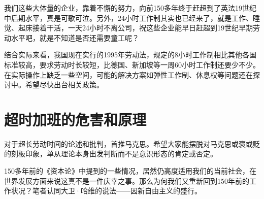 我们这些大体量的企业，靠着不懈的努力，向前150多年终于赶超到了英法19世纪中后期水平，真是可歌可泣。另外，24小时工作制其实也已经来了，就是工作、睡觉、起床接着干活，一天24小时不离公司，祝这些企业能早日赶超到19世纪早期劳动水平吧，就是不知道是否还需要童工呢？

结合实际来看，我国现在实行的1995年劳动法，规定的8小时工作制相比其他各国标准较高，要求劳动时长较短，比德国、新加坡等一周60小时工作制还要少不少。在实际操作上缺乏一些空间，可能的解决方案如弹性工作制、休息权等问题还在探讨中。希望尽快出台相关政策。

\section{超时加班的危害和原理}
\label{sec:gzryuanli}

对于超长劳动时间的论述和批判，首推马克思。希望大家能摆脱对马克思或褒或贬的刻板印象，单从理论本身出发判断而不是意识形态的肯定或否定。

150多年前的《资本论》中提到的一些情况，居然仍高度适用我们的当前社会，在世界发展方面来说这真不是一件庆幸之事。那么为何我们又重新回到150年前的工作状况？笔者认同大卫·哈维的说法——因新自由主义的盛行。

